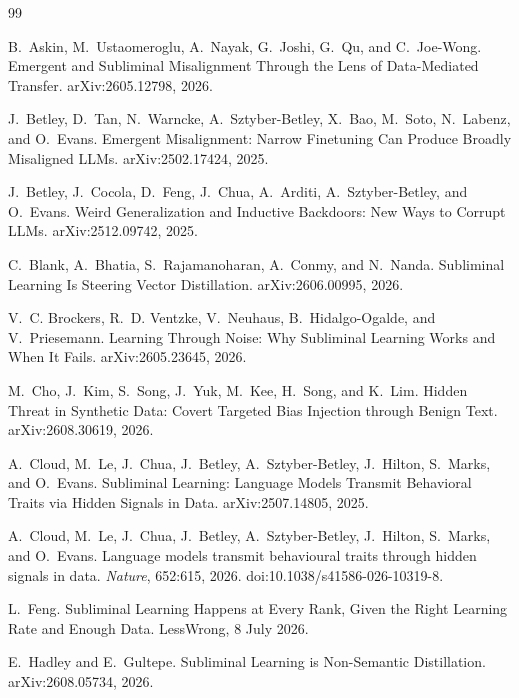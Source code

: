 \documentclass[11pt,a4paper]{article}
\begin{document}
\begin{thebibliography}{99}
\small

B.~Askin, M.~Ustaomeroglu, A.~Nayak, G.~Joshi, G.~Qu, and C.~Joe-Wong.
\newblock Emergent and Subliminal Misalignment Through the Lens of Data-Mediated Transfer.
\newblock arXiv:2605.12798, 2026.

J.~Betley, D.~Tan, N.~Warncke, A.~Sztyber-Betley, X.~Bao, M.~Soto, N.~Labenz, and O.~Evans.
\newblock Emergent Misalignment: Narrow Finetuning Can Produce Broadly Misaligned LLMs.
\newblock arXiv:2502.17424, 2025.

J.~Betley, J.~Cocola, D.~Feng, J.~Chua, A.~Arditi, A.~Sztyber-Betley, and O.~Evans.
\newblock Weird Generalization and Inductive Backdoors: New Ways to Corrupt LLMs.
\newblock arXiv:2512.09742, 2025.

C.~Blank, A.~Bhatia, S.~Rajamanoharan, A.~Conmy, and N.~Nanda.
\newblock Subliminal Learning Is Steering Vector Distillation.
\newblock arXiv:2606.00995, 2026.

V.~C. Brockers, R.~D. Ventzke, V.~Neuhaus, B.~Hidalgo-Ogalde, and V.~Priesemann.
\newblock Learning Through Noise: Why Subliminal Learning Works and When It Fails.
\newblock arXiv:2605.23645, 2026.

M.~Cho, J.~Kim, S.~Song, J.~Yuk, M.~Kee, H.~Song, and K.~Lim.
\newblock Hidden Threat in Synthetic Data: Covert Targeted Bias Injection through Benign Text.
\newblock arXiv:2608.30619, 2026.

A.~Cloud, M.~Le, J.~Chua, J.~Betley, A.~Sztyber-Betley, J.~Hilton, S.~Marks, and O.~Evans.
\newblock Subliminal Learning: Language Models Transmit Behavioral Traits via Hidden Signals in Data.
\newblock arXiv:2507.14805, 2025.

A.~Cloud, M.~Le, J.~Chua, J.~Betley, A.~Sztyber-Betley, J.~Hilton, S.~Marks, and O.~Evans.
\newblock Language models transmit behavioural traits through hidden signals in data.
\newblock \emph{Nature}, 652:615, 2026. doi:10.1038/s41586-026-10319-8.

L.~Feng.
\newblock Subliminal Learning Happens at Every Rank, Given the Right Learning Rate and Enough Data.
\newblock LessWrong, 8 July 2026.

E.~Hadley and E.~Gultepe.
\newblock Subliminal Learning is Non-Semantic Distillation.
\newblock arXiv:2608.05734, 2026.


\end{thebibliography}
\end{document}
